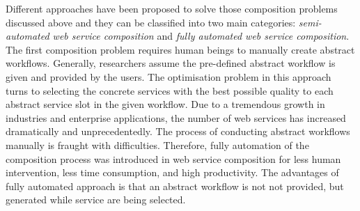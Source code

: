 Different approaches have been proposed to solve those composition problems discussed above and they can be classified into two main categories: \emph{semi-automated web service composition} and \emph{fully automated web service composition}. The first composition problem requires human beings to manually create abstract workflows. Generally, researchers assume the pre-defined abstract workflow is given and provided by the users. The optimisation problem in this approach turns to selecting the concrete services with the best possible quality to each abstract service slot in the given workflow. Due to a tremendous growth in industries and enterprise applications, the number of web services has increased dramatically and unprecedentedly. The process of conducting abstract workflows  manually is fraught with difficulties. Therefore, fully automation of the composition process was introduced in web service composition for less human intervention, less time consumption, and high productivity. The advantages of fully automated approach is that an abstract workflow is not not provided, but generated while service are being selected. 


